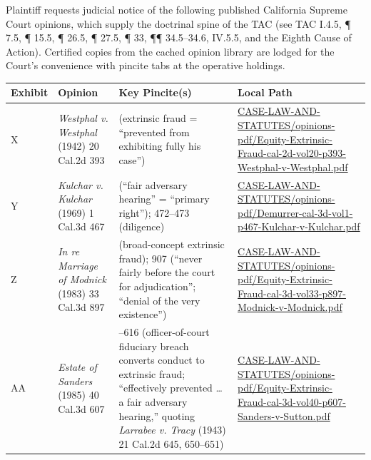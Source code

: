 Plaintiff requests judicial notice of the following published California Supreme Court opinions, which supply the doctrinal spine of the TAC (see TAC \textsection{}I.4.5, ¶ 7.5, ¶ 15.5, ¶ 26.5, ¶ 27.5, ¶ 33, ¶¶ 34.5--34.6, \textsection{}IV.5.5, and the Eighth Cause of Action). Certified copies from the cached opinion library are lodged for the Court's convenience with pincite tabs at the operative holdings.

{\def\LTcaptype{table} %
\begin{longtable}[]{@{}
  >{\raggedright\arraybackslash}p{}
  >{\raggedright\arraybackslash}p{}
  >{\raggedright\arraybackslash}p{}
  >{\raggedright\arraybackslash}p{}@{}}
\toprule\noalign{}
\begin{minipage}[b]{\linewidth}\raggedright
Exhibit
\end{minipage} & \begin{minipage}[b]{\linewidth}\raggedright
Opinion
\end{minipage} & \begin{minipage}[b]{\linewidth}\raggedright
Key Pincite(s)
\end{minipage} & \begin{minipage}[b]{\linewidth}\raggedright
Local Path
\end{minipage} \\
\midrule\noalign{}
\endhead
\bottomrule\noalign{}
\endlastfoot
X & \emph{Westphal v. Westphal} (1942) 20 Cal.2d 393 & 397 (extrinsic fraud = ``prevented from exhibiting fully his case'') & \href{../../CASE-LAW-AND-STATUTES/opinions-pdf/Equity-Extrinsic-Fraud-cal-2d-vol20-p393-Westphal-v-Westphal.pdf}{CASE-LAW-AND-STATUTES/opinions-pdf/Equity-Extrinsic-Fraud-cal-2d-vol20-p393-Westphal-v-Westphal.pdf} \\
Y & \emph{Kulchar v. Kulchar} (1969) 1 Cal.3d 467 & 471 (``fair adversary hearing'' = ``primary right''); 472--473 (diligence) & \href{../../CASE-LAW-AND-STATUTES/opinions-pdf/Demurrer-cal-3d-vol1-p467-Kulchar-v-Kulchar.pdf}{CASE-LAW-AND-STATUTES/opinions-pdf/Demurrer-cal-3d-vol1-p467-Kulchar-v-Kulchar.pdf} \\
Z & \emph{In re Marriage of Modnick} (1983) 33 Cal.3d 897 & 905 (broad-concept extrinsic fraud); 907 (``never fairly before the court for adjudication''; ``denial of the very existence'') & \href{../../CASE-LAW-AND-STATUTES/opinions-pdf/Equity-Extrinsic-Fraud-cal-3d-vol33-p897-Modnick-v-Modnick.pdf}{CASE-LAW-AND-STATUTES/opinions-pdf/Equity-Extrinsic-Fraud-cal-3d-vol33-p897-Modnick-v-Modnick.pdf} \\
AA & \emph{Estate of Sanders} (1985) 40 Cal.3d 607 & 614--616 (officer-of-court fiduciary breach converts conduct to extrinsic fraud; ``effectively prevented \ldots{} a fair adversary hearing,'' quoting \emph{Larrabee v. Tracy} (1943) 21 Cal.2d 645, 650--651) & \href{../../CASE-LAW-AND-STATUTES/opinions-pdf/Equity-Extrinsic-Fraud-cal-3d-vol40-p607-Sanders-v-Sutton.pdf}{CASE-LAW-AND-STATUTES/opinions-pdf/Equity-Extrinsic-Fraud-cal-3d-vol40-p607-Sanders-v-Sutton.pdf} \\
\end{longtable}
}
